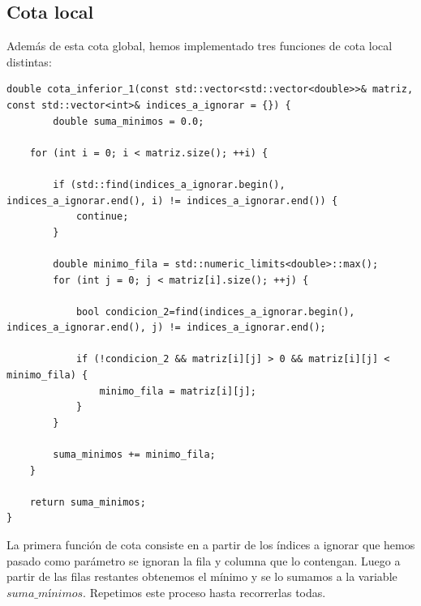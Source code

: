 \documentclass[11pt,openany]{book}
\begin{document}
      
\subsection{Cota local}

Además de esta cota global, hemos implementado tres funciones de cota local distintas:
\\ 
\begin{lstlisting}
double cota_inferior_1(const std::vector<std::vector<double>>& matriz, const std::vector<int>& indices_a_ignorar = {}) {
        double suma_minimos = 0.0;
    
    for (int i = 0; i < matriz.size(); ++i) {
        
        if (std::find(indices_a_ignorar.begin(), indices_a_ignorar.end(), i) != indices_a_ignorar.end()) {
            continue;
        }
    
        double minimo_fila = std::numeric_limits<double>::max();
        for (int j = 0; j < matriz[i].size(); ++j) {
                
            bool condicion_2=find(indices_a_ignorar.begin(), indices_a_ignorar.end(), j) != indices_a_ignorar.end();
               
            if (!condicion_2 && matriz[i][j] > 0 && matriz[i][j] < minimo_fila) {
                minimo_fila = matriz[i][j];
            }
        }
    
        suma_minimos += minimo_fila;
    }
    
    return suma_minimos;
}   
\end{lstlisting}

La primera función de cota consiste en a partir de los índices a ignorar que hemos pasado como parámetro se ignoran la fila y
columna que lo contengan. Luego a partir de las filas restantes obtenemos el mínimo y se lo sumamos a la variable 
$suma\_mínimos$. Repetimos este proceso hasta recorrerlas todas.
\end{document}
